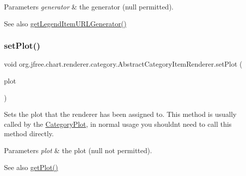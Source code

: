 \begin{DoxyParams}{Parameters}
{\em generator} & the generator ({\ttfamily null} permitted).\\
\hline
\end{DoxyParams}
\begin{DoxySeeAlso}{See also}
\mbox{\hyperlink{classorg_1_1jfree_1_1chart_1_1renderer_1_1category_1_1_abstract_category_item_renderer_a1d5b553663f69bcddf3a57dfed428c61}{get\+Legend\+Item\+U\+R\+L\+Generator()}} 
\end{DoxySeeAlso}
\mbox{\label{classorg_1_1jfree_1_1chart_1_1renderer_1_1category_1_1_abstract_category_item_renderer_ace23a8e40019e23cde2ff8e729bb36a0}} 
\subsubsection{\texorpdfstring{set\+Plot()}{setPlot()}}
{\footnotesize\ttfamily void org.\+jfree.\+chart.\+renderer.\+category.\+Abstract\+Category\+Item\+Renderer.\+set\+Plot (\begin{DoxyParamCaption}\item[{\mbox{\hyperlink{classorg_1_1jfree_1_1chart_1_1plot_1_1_category_plot}{Category\+Plot}}}]{plot }\end{DoxyParamCaption})}

Sets the plot that the renderer has been assigned to. This method is usually called by the \mbox{\hyperlink{}{Category\+Plot}}, in normal usage you shouldn\textquotesingle{}t need to call this method directly.


\begin{DoxyParams}{Parameters}
{\em plot} & the plot ({\ttfamily null} not permitted).\\
\hline
\end{DoxyParams}
\begin{DoxySeeAlso}{See also}
\mbox{\hyperlink{classorg_1_1jfree_1_1chart_1_1renderer_1_1category_1_1_abstract_category_item_renderer_a83ebcad71dce7b3494225aa077667296}{get\+Plot()}} 
\end{DoxySeeAlso}


